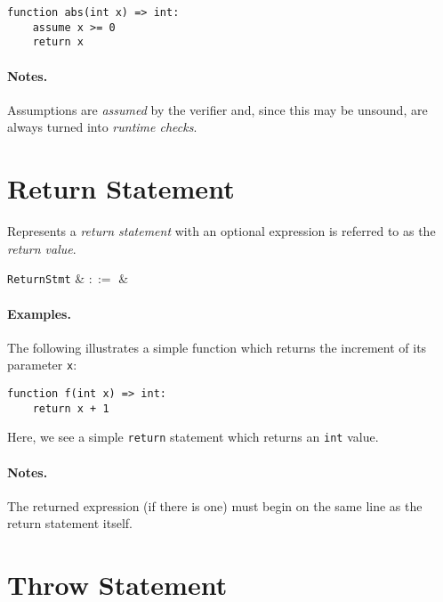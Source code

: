 \begin{lstlisting}
function abs(int x) => int:
    assume x >= 0
    return x
\end{lstlisting}

\paragraph{Notes.} Assumptions are {\em assumed} by the verifier and, since
this may be unsound, are always turned into {\em runtime checks}.


\section{Return Statement}

Represents a {\em return statement} with an optional expression is referred to as the {\em return value}.

\begin{syntax}
  \verb+ReturnStmt+ & $::=$ & \ \\
\end{syntax}

\paragraph{Examples.} The following illustrates a simple function
which returns the increment of its parameter \lstinline{x}:

\begin{lstlisting}
function f(int x) => int:
    return x + 1
\end{lstlisting}

Here, we see a simple \lstinline{return} statement which returns an \lstinline{int} value.

\paragraph{Notes.}  The returned expression (if there is one) must
begin on the same line as the return statement itself.


\section{Throw Statement}

